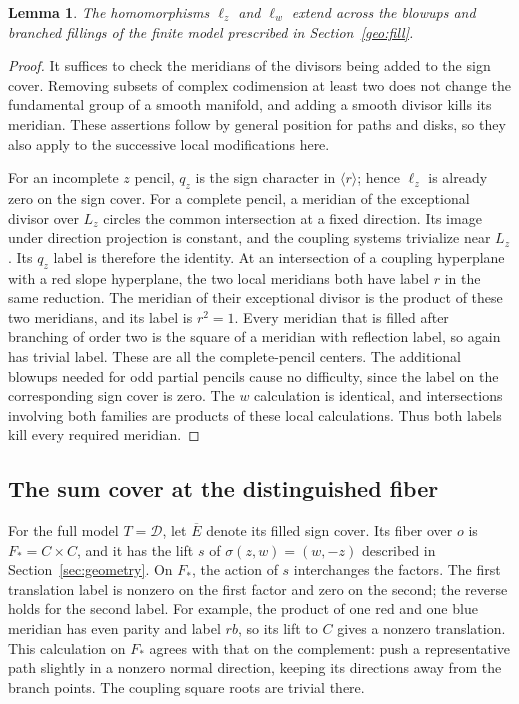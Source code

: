 \documentclass[11pt,reqno]{amsart}
\numberwithin{equation}{section}
\newtheorem{lemma}[theorem]{Lemma}
\theoremstyle{definition}
\theoremstyle{remark}
\begin{document}
\begin{lemma}\label{mod:extension}
The homomorphisms $\ell_z$ and $\ell_w$ extend across the blowups and
branched fillings of the finite model prescribed in
Section~\ref{geo:fill}.
\end{lemma}
\begin{proof}
It suffices to check the meridians of the divisors being added to the
sign cover.  Removing subsets of complex codimension at least two
does not change the fundamental group of a smooth manifold, and
adding a smooth divisor kills its meridian.  These assertions follow
by general position for paths and disks, so they also apply to the
successive local modifications here.

For an incomplete $z$ pencil, $q_z$ is the sign character in
$\langle r\rangle$; hence $\ell_z$ is already zero on the sign cover.
For a complete pencil, a meridian of the exceptional divisor over
$L_z$ circles the common intersection at a fixed direction.  Its
image under direction projection is constant, and the coupling
systems trivialize near $L_z$.  Its $q_z$ label is therefore the
identity.  At an intersection of a coupling hyperplane with a red
slope hyperplane, the two local meridians both have label $r$ in the
same reduction.  The meridian of their exceptional divisor is the
product of these two meridians, and its label is $r^2=1$.  Every
meridian that is filled after branching of order two is the square
of a meridian with reflection label, so again has trivial label.
These are all the complete-pencil centers.  The additional blowups
needed for odd partial pencils cause no difficulty, since the label
on the corresponding sign cover is zero.  The $w$ calculation is
identical, and intersections involving both families are products
of these local calculations.  Thus both labels kill every required
meridian.
\end{proof}

\subsection{The sum cover at the distinguished fiber}

For the full model $T=\mathcal D$, let $\overline E$ denote its filled sign
cover.  Its fiber over $o$ is $F_*=C\times C$, and it has the lift
$s$ of $\sigma(z,w)=(w,-z)$ described in Section~\ref{sec:geometry}.
On $F_*$, the action of $s$ interchanges the factors.  The first
translation label is nonzero on the first factor and zero on the
second; the reverse holds for the second label.  For example, the
product of one red and one blue meridian has even parity and label
$rb$, so its lift to $C$ gives a nonzero translation.  This calculation
on $F_*$ agrees with that on the complement: push a representative
path slightly in a nonzero normal direction, keeping its directions
away from the branch points.  The coupling square roots are
trivial there.
\end{document}
